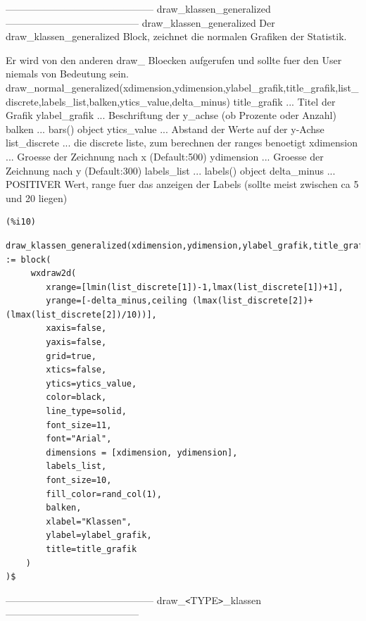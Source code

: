 \documentclass[12pt]{article}
\begin{document}
--------------------------------------------- draw\_klassen\_generalized -----------------------------------------
draw\_klassen\_generalized
    Der draw\_klassen\_generalized Block, zeichnet die normalen Grafiken der Statistik.

    Er wird von den anderen draw\_ Bloecken aufgerufen und sollte fuer den User niemals von Bedeutung sein.
draw\_normal\_generalized(xdimension,ydimension,ylabel\_grafik,title\_grafik,list\_discrete,labels\_list,balken,ytics\_value,delta\_minus)
title\_grafik    ... Titel der Grafik
ylabel\_grafik   ... Beschriftung der y\_achse (ob Prozente oder Anzahl)
balken          ... bars() object
ytics\_value     ... Abstand der Werte auf der y-Achse
list\_discrete   ... die discrete liste, zum berechnen der ranges benoetigt 
xdimension      ... Groesse der Zeichnung nach x (Default:500)
ydimension      ... Groesse der Zeichnung nach y (Default:300)
labels\_list     ... labels() object
delta\_minus     ... POSITIVER Wert, range fuer das anzeigen der Labels (sollte meist zwischen ca 5 und 20 liegen)

\noindent
\begin{minipage}[t]{8ex}{\color{red}\bf
\begin{verbatim}
(%i10) 
\end{verbatim}}
\end{minipage}
\begin{minipage}[t]{\textwidth}{\color{blue}
\begin{verbatim}
draw_klassen_generalized(xdimension,ydimension,ylabel_grafik,title_grafik,list_discrete,labels_list,balken,ytics_value,delta_minus) := block(
     wxdraw2d(
        xrange=[lmin(list_discrete[1])-1,lmax(list_discrete[1])+1], 
        yrange=[-delta_minus,ceiling (lmax(list_discrete[2])+(lmax(list_discrete[2])/10))],
        xaxis=false, 
        yaxis=false, 
        grid=true,
        xtics=false, 
        ytics=ytics_value,
        color=black,
        line_type=solid,
        font_size=11, 
        font="Arial",
        dimensions = [xdimension, ydimension],
        labels_list,
        font_size=10,
        fill_color=rand_col(1),
        balken,
        xlabel="Klassen", 
        ylabel=ylabel_grafik,
        title=title_grafik
    )
)$
\end{verbatim}}
\end{minipage}

--------------------------------------------- draw\_\verb|<|TYPE\verb|>|\_klassen -----------------------------------------
\end{document}
